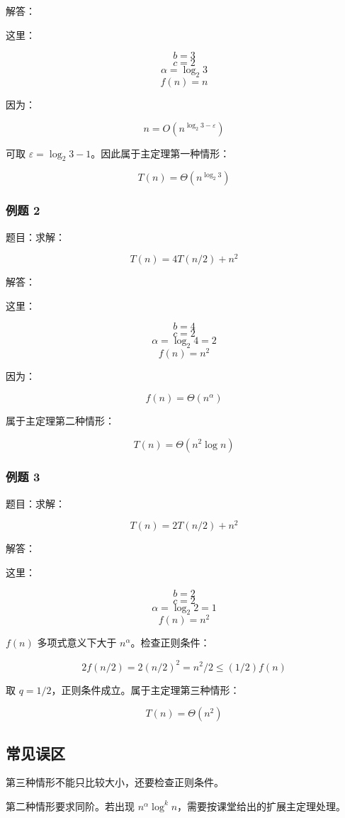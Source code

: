 \documentclass[UTF8,zihao=-4]{ctexart}
\begin{document}
解答：

这里：

\[b = 3\]
\[c = 2\]
\[\alpha = \log_2 3\]
\[f(n) = n\]

因为：

\[n = O(n^{\log_2 3 - \varepsilon})\]

可取 $\varepsilon = \log_2 3 - 1$。因此属于主定理第一种情形：

\[T(n) = \Theta(n^{\log_2 3})\]

\subsubsection*{例题 2}

题目：求解：

\[T(n) = 4T(n/2) + n^{2}\]

解答：

这里：

\[b = 4\]
\[c = 2\]
\[\alpha = \log_2 4 = 2\]
\[f(n) = n^{2}\]

因为：

\[f(n) = \Theta(n^\alpha)\]

属于主定理第二种情形：

\[T(n) = \Theta(n^{2} \log n)\]

\subsubsection*{例题 3}

题目：求解：

\[T(n) = 2T(n/2) + n^{2}\]

解答：

这里：

\[b = 2\]
\[c = 2\]
\[\alpha = \log_2 2 = 1\]
\[f(n) = n^{2}\]

$f(n)$ 多项式意义下大于 $n^\alpha$。检查正则条件：

\[2f(n/2) = 2(n/2)^{2} = n^{2}/2 \le  (1/2)f(n)\]

取 $q = 1/2$，正则条件成立。属于主定理第三种情形：

\[T(n) = \Theta(n^{2})\]

\subsection*{常见误区}

第三种情形不能只比较大小，还要检查正则条件。

第二种情形要求同阶。若出现 $n^\alpha \log^k n$，需要按课堂给出的扩展主定理处理。
\end{document}

